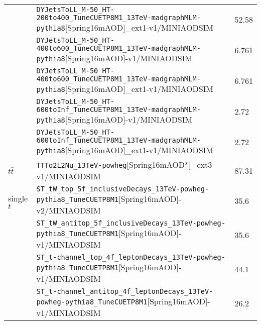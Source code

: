 \begin{table}
\begin{tabular}{l|l|l}
                            & \verb /DYJetsToLL_M-50_HT-200to400_TuneCUETP8M1_13TeV-madgraphMLM-pythia8/[Spring16mAOD]_ext1-v1/MINIAODSIM                     & 52.58 \\
                            & \verb /DYJetsToLL_M-50_HT-400to600_TuneCUETP8M1_13TeV-madgraphMLM-pythia8/[Spring16mAOD]-v1/MINIAODSIM                          & 6.761 \\
                            & \verb /DYJetsToLL_M-50_HT-400to600_TuneCUETP8M1_13TeV-madgraphMLM-pythia8/[Spring16mAOD]_ext1-v1/MINIAODSIM                     & 6.761 \\
                            & \verb /DYJetsToLL_M-50_HT-600toInf_TuneCUETP8M1_13TeV-madgraphMLM-pythia8/[Spring16mAOD]-v1/MINIAODSIM                          & 2.72 \\
                            & \verb /DYJetsToLL_M-50_HT-600toInf_TuneCUETP8M1_13TeV-madgraphMLM-pythia8/[Spring16mAOD]_ext1-v1/MINIAODSIM                     & 2.72 \\
     $t\bar{t}$       %
                            & \verb /TTTo2L2Nu_13TeV-powheg/[Spring16mAOD*]_ext3-v1/MINIAODSIM						                                                    & 87.31 \\
     single $t$             & \verb /ST_tW_top_5f_inclusiveDecays_13TeV-powheg-pythia8_TuneCUETP8M1/[Spring16mAOD]-v2/MINIAODSIM			                        & 35.6 \\
                            & \verb /ST_tW_antitop_5f_inclusiveDecays_13TeV-powheg-pythia8_TuneCUETP8M1/[Spring16mAOD]-v1/MINIAODSIM                          & 35.6 \\
                            & \verb /ST_t-channel_top_4f_leptonDecays_13TeV-powheg-pythia8_TuneCUETP8M1/[Spring16mAOD]-v1/MINIAODSIM                          & 44.1 \\
                            & \verb /ST_t-channel_antitop_4f_leptonDecays_13TeV-powheg-pythia8_TuneCUETP8M1/[Spring16mAOD]-v1/MINIAODSIM                      & 26.2 \\

\end{tabular}
\end{table}
